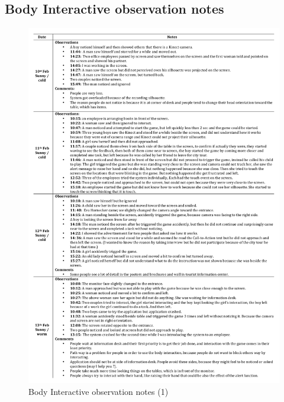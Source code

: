 \begin{appendices}
\section{Body Interactive observation notes}
\begin{figure}[H]
 \centering 
    \includegraphics[width=\textwidth,height=0.8\textheight]{Appendices/8/body-interactive/Note_1.pdf}
    \caption{Body Interactive observation notes (1)}
     \label{app:body-Interactiveobservation-notes1}%
\end{figure}



\end{appendices}
